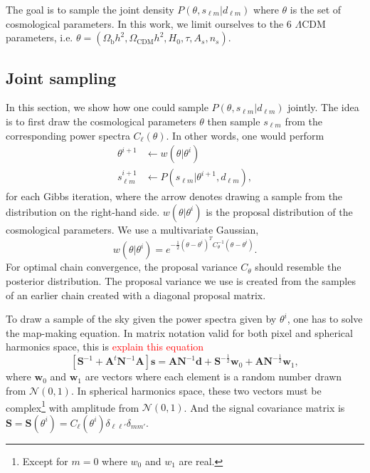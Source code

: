 \documentclass[twocolumn]{../common/aa}
\begin{document}
The goal is to sample the joint density $P(\theta, s_{\ell m} | d_{\ell m})$ where $\theta$ is the set of cosmological parameters. In this work, we limit ourselves to the 6 $\Lambda$CDM parameters, i.e. $\theta=(\Omega_{\textrm{b}}h^2, \Omega_{\textrm{CDM}}h^2, H_0, \tau, A_s, n_s)$.

\subsection{Joint sampling}

In this section, we show how one could sample $P(\theta, s_{\ell m} | d_{\ell m})$ jointly. The idea is to first draw the cosmological parameters $\theta$ then sample $s_{\ell m}$ from the corresponding power spectra $C_{\ell}(\theta)$. In other words, one would perform
\begin{align}
    \theta^{i+1} 
 &\leftarrow w(\theta |\theta^i)\\
    s_{\ell m}^{i+1} &\leftarrow P(s_{\ell m} | \theta^{i+1}, d_{\ell m}),
\end{align}
for each Gibbs iteration, where the arrow denotes drawing a sample from the distribution on the right-hand side. $w(\theta |\theta^i)$ is the proposal distribution of the cosmological parameters. We use a multivariate Gaussian,
\begin{equation}
w(\theta |\theta^i) = e^{-\frac12 \left(\theta - \theta^i \right)^T C_{\theta}^{-1}\left(\theta - \theta^i \right)}.
\end{equation}
For optimal chain convergence, the proposal variance $C_{\theta}$ should resemble the posterior distribution. The proposal variance we use is created from the samples of an earlier chain created with a diagonal proposal matrix.

To draw a sample of the sky given the power spectra given by $\theta^i$, one has to solve the map-making equation. In matrix notation valid for both pixel and spherical harmonics space, this is \textcolor{red}{explain this equation}
\begin{equation}
    \label{eq:mapmakingeq}
    \left[\mathbf{S}^{-1} + \mathbf{A}^t \mathbf{N}^{-1}\mathbf{A} \right]\mathbf{s} = \mathbf{A} \mathbf{N}^{-1} \mathbf{d} + \mathbf{S}^{-\frac{1}{2}}\mathbf{w}_0 +\mathbf{A N}^{-\frac{1}{2}}\mathbf{w}_1,
\end{equation}
where $\mathbf{w}_0$ and $\mathbf{w}_1$ are vectors where each element is a random number drawn from $\mathcal{N}(0, 1)$. In spherical harmonics space, these two vectors must be complex\footnote{Except for $m=0$ where $w_0$ and $w_1$ are real.} with amplitude from $\mathcal{N}(0, 1)$. And the signal covariance matrix is $\mathbf{S} = \mathbf{S}(\theta^i) = C_{\ell}\left(\theta^i\right)\delta_{\ell \ell'}\delta_{mm'}$.
\end{document}
